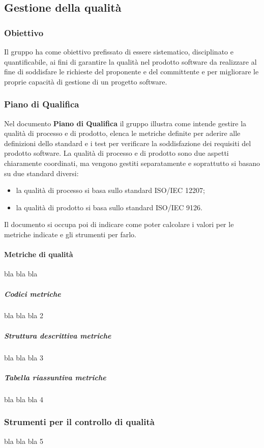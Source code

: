 \subsection{Gestione della qualità}
\subsubsection{Obiettivo}
Il gruppo \Gruppo{} ha come obiettivo prefissato di essere sistematico, disciplinato e quantificabile, ai fini di garantire la qualità nel prodotto software da realizzare al fine di soddisfare le richieste del proponente e del committente e per migliorare le proprie capacità di gestione di un progetto software.

\subsubsection{Piano di Qualifica}
Nel documento \textbf{Piano di Qualifica} il gruppo illustra come intende gestire la qualità di processo e di prodotto, elenca le metriche definite per aderire alle definizioni dello standard e i test per verificare la soddisfazione dei requisiti del prodotto software.
La qualità di processo e di prodotto sono due aspetti chiaramente coordinati, ma vengono gestiti separatamente e soprattutto si basano su due standard diversi:
\begin{itemize}
    \item la qualità di processo si basa sullo standard ISO/IEC 12207;
    \item la qualità di prodotto si basa sullo standard ISO/IEC 9126.
\end{itemize}
Il documento si occupa poi di indicare come poter calcolare i valori per le metriche indicate e gli strumenti per farlo.

\setlength{\parindent}{-0.1em}
\paragraph{Metriche di qualità}
bla bla bla
\subparagraph{Codici metriche}
bla bla bla 2
\subparagraph{Struttura descrittiva metriche}
bla bla bla 3
\subparagraph{Tabella riassuntiva metriche}
bla bla bla 4

\subsubsection{Strumenti per il controllo di qualità}
bla bla bla 5